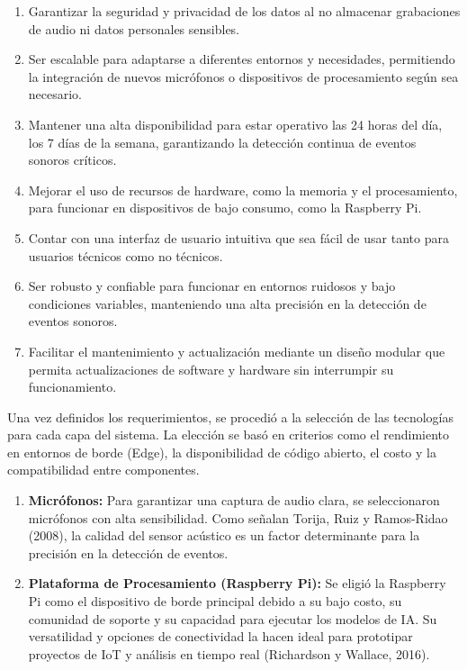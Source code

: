 
\begin{enumerate}
  \item Garantizar la seguridad y privacidad de los datos al no almacenar grabaciones de audio ni datos personales sensibles.
  \item Ser escalable para adaptarse a diferentes entornos y necesidades, permitiendo la integración de nuevos micrófonos o dispositivos de procesamiento según sea necesario.
  \item Mantener una alta disponibilidad para estar operativo las 24 horas del día, los 7 días de la semana, garantizando la detección continua de eventos sonoros críticos.
  \item Mejorar el uso de recursos de hardware, como la memoria y el procesamiento, para funcionar en dispositivos de bajo consumo, como la Raspberry Pi.
  \item Contar con una interfaz de usuario intuitiva que sea fácil de usar tanto para usuarios técnicos como no técnicos.
  \item Ser robusto y confiable para funcionar en entornos ruidosos y bajo condiciones variables, manteniendo una alta precisión en la detección de eventos sonoros.
  \item Facilitar el mantenimiento y actualización mediante un diseño modular que permita actualizaciones de software y hardware sin interrumpir su funcionamiento.
\end{enumerate}


Una vez definidos los requerimientos, se procedió a la selección de las tecnologías para cada capa del sistema. La elección se basó en criterios como el rendimiento en entornos de borde (Edge), la disponibilidad de código abierto, el costo y la compatibilidad entre componentes.


\begin{enumerate}
  \item \textbf{Micrófonos:} Para garantizar una captura de audio clara, se seleccionaron micrófonos con alta sensibilidad. Como señalan Torija, Ruiz y Ramos-Ridao (2008), la calidad del sensor acústico es un factor determinante para la precisión en la detección de eventos.
  \item \textbf{Plataforma de Procesamiento (Raspberry Pi):} Se eligió la Raspberry Pi como el dispositivo de borde principal debido a su bajo costo, su comunidad de soporte y su capacidad para ejecutar los modelos de IA. Su versatilidad y opciones de conectividad la hacen ideal para prototipar proyectos de IoT y análisis en tiempo real (Richardson y Wallace, 2016).
\end{enumerate}

